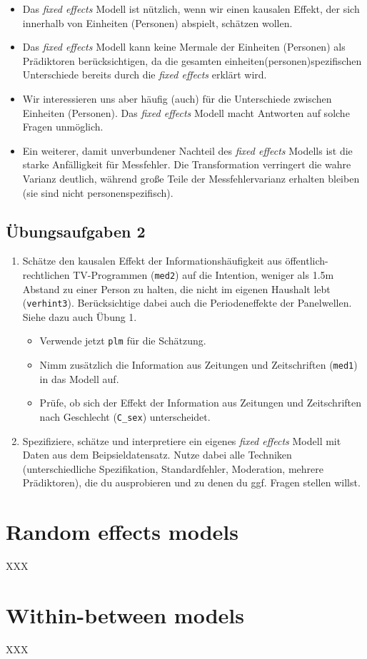 \documentclass[]{book}
\providecommand{\tightlist}{%
  \setlength{\itemsep}{0pt}\setlength{\parskip}{0pt}}
\begin{document}
\begin{itemize}
\item
  Das \emph{fixed effects} Modell ist nützlich, wenn wir einen kausalen Effekt, der sich innerhalb von Einheiten (Personen) abspielt, schätzen wollen.
\item
  Das \emph{fixed effects} Modell kann keine Mermale der Einheiten (Personen) als Prädiktoren berücksichtigen, da die gesamten einheiten(personen)spezifischen Unterschiede bereits durch die \emph{fixed effects} erklärt wird.
\item
  Wir interessieren uns aber häufig (auch) für die Unterschiede zwischen Einheiten (Personen). Das \emph{fixed effects} Modell macht Antworten auf solche Fragen unmöglich.
\item
  Ein weiterer, damit unverbundener Nachteil des \emph{fixed effects} Modells ist die starke Anfälligkeit für Messfehler. Die Transformation verringert die wahre Varianz deutlich, während große Teile der Messfehlervarianz erhalten bleiben (sie sind nicht personenspezifisch).
\end{itemize}

\hypertarget{uxfcbungsaufgaben-2}{%
\section{Übungsaufgaben 2}\label{uxfcbungsaufgaben-2}}

\begin{enumerate}
\def\labelenumi{\arabic{enumi})}
\tightlist
\item
  Schätze den kausalen Effekt der Informationshäufigkeit aus öffentlich-rechtlichen TV-Programmen (\texttt{med2}) auf die Intention, weniger als 1.5m Abstand zu einer Person zu halten, die nicht im eigenen Haushalt lebt (\texttt{verhint3}). Berücksichtige dabei auch die Periodeneffekte der Panelwellen. Siehe dazu auch Übung 1.

  \begin{itemize}
  \tightlist
  \item
    Verwende jetzt \texttt{plm} für die Schätzung.
  \item
    Nimm zusätzlich die Information aus Zeitungen und Zeitschriften (\texttt{med1}) in das Modell auf.
  \item
    Prüfe, ob sich der Effekt der Information aus Zeitungen und Zeitschriften nach Geschlecht (\texttt{C\_sex}) unterscheidet.
  \end{itemize}
\item
  Spezifiziere, schätze und interpretiere ein eigenes \emph{fixed effects} Modell mit Daten aus dem Beipsieldatensatz. Nutze dabei alle Techniken (unterschiedliche Spezifikation, Standardfehler, Moderation, mehrere Prädiktoren), die du ausprobieren und zu denen du ggf. Fragen stellen willst.
\end{enumerate}

\hypertarget{random-effects-models}{%
\chapter{Random effects models}\label{random-effects-models}}

XXX

\hypertarget{within-between-models}{%
\chapter{Within-between models}\label{within-between-models}}

XXX


\end{document}
